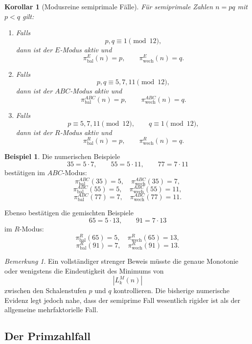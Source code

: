 \documentclass[11pt,a4paper]{article}
\newtheorem{korollar}[satz]{Korollar}
\theoremstyle{definition}
\newtheorem{beispiel}[satz]{Beispiel}
\theoremstyle{remark}
\newtheorem{bemerkung}[satz]{Bemerkung}
\begin{document}
	\begin{korollar}[Modusreine semiprimale Fälle]
		\label{kor:modusrein_semiprime}
		Für semiprimale Zahlen \(n=pq\) mit \(p<q\) gilt:
		
		\begin{enumerate}
			\item Falls
			\[
			p,q\equiv 1\pmod{12},
			\]
			dann ist der \(E\)-Modus aktiv und
			\[
			\pi_{\mathrm{bal}}^{E}(n)=p,\qquad
			\pi_{\mathrm{wech}}^{E}(n)=q.
			\]
			
			\item Falls
			\[
			p,q\equiv 5,7,11\pmod{12},
			\]
			dann ist der \(ABC\)-Modus aktiv und
			\[
			\pi_{\mathrm{bal}}^{ABC}(n)=p,\qquad
			\pi_{\mathrm{wech}}^{ABC}(n)=q.
			\]
			
			\item Falls
			\[
			p\equiv 5,7,11\pmod{12},\qquad q\equiv 1\pmod{12},
			\]
			dann ist der \(R\)-Modus aktiv und
			\[
			\pi_{\mathrm{bal}}^{R}(n)=p,\qquad
			\pi_{\mathrm{wech}}^{R}(n)=q.
			\]
		\end{enumerate}
	\end{korollar}
	
	\begin{beispiel}
		Die numerischen Beispiele
		\[
		35=5\cdot 7,\qquad
		55=5\cdot 11,\qquad
		77=7\cdot 11
		\]
		bestätigen im \(ABC\)-Modus:
		\[
		\pi_{\mathrm{bal}}^{ABC}(35)=5,\quad \pi_{\mathrm{wech}}^{ABC}(35)=7,
		\]
		\[
		\pi_{\mathrm{bal}}^{ABC}(55)=5,\quad \pi_{\mathrm{wech}}^{ABC}(55)=11,
		\]
		\[
		\pi_{\mathrm{bal}}^{ABC}(77)=7,\quad \pi_{\mathrm{wech}}^{ABC}(77)=11.
		\]
		
		Ebenso bestätigen die gemischten Beispiele
		\[
		65=5\cdot 13,\qquad 91=7\cdot 13
		\]
		im \(R\)-Modus:
		\[
		\pi_{\mathrm{bal}}^{R}(65)=5,\quad \pi_{\mathrm{wech}}^{R}(65)=13,
		\]
		\[
		\pi_{\mathrm{bal}}^{R}(91)=7,\quad \pi_{\mathrm{wech}}^{R}(91)=13.
		\]
	\end{beispiel}
	
	\begin{bemerkung}
		Ein vollständiger strenger Beweis müsste die genaue Monotonie oder wenigstens die
		Eindeutigkeit des Minimums von
		\[
		|L_k^M(n)|
		\]
		zwischen den Schalenstufen \(p\) und \(q\) kontrollieren. Die bisherige numerische Evidenz
		legt jedoch nahe, dass der semiprime Fall wesentlich rigider ist als der allgemeine
		mehrfaktorielle Fall.
	\end{bemerkung}
	
	\subsection{Der Primzahlfall}
	
\end{document}
